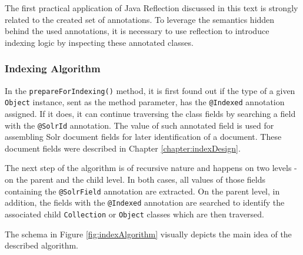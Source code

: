 The first practical application of Java Reflection discussed in this text is strongly related to the created set of annotations.
To leverage the semantics hidden behind the used annotations, it is necessary to use reflection to introduce indexing logic by inspecting these annotated classes.

\subsubsection{Indexing Algorithm}

In the \texttt{prepareForIndexing()} method, it is first found out if the type of a given \texttt{Object} instance, sent as the method parameter, has the \texttt{@Indexed} annotation assigned.
If it does, it can continue traversing the class fields by searching a field with the \texttt{@SolrId} annotation.
The value of such annotated field is used for assembling Solr document fields for later identification of a document.
These document fields were described in Chapter \ref{chapter:indexDesign}.

The next step of the algorithm is of recursive nature and happens on two levels - on the parent and the child level.
In both cases, all values of those fields containing the \texttt{@SolrField} annotation are extracted.
On the parent level, in addition, the fields with the \texttt{@Indexed} annotation are searched to identify the associated child \texttt{Collection} or \texttt{Object} classes which are then traversed.


The schema in Figure \ref{fig:indexAlgorithm} visually depicts the main idea of the described algorithm.



